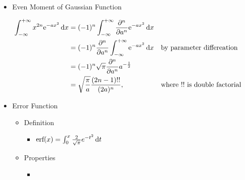 \begin{itemize}
\item Even Moment of Gaussian Function
	\begin{itemize}
	\Item \begin{align*} \displaystyle \int_{-\infty}^{+\infty} x^{2n}{\rm e}^{-ax^2}\mathop{}\!\mathrm{d} x &= (-1)^n\int^{+\infty}_{-\infty} \frac {\partial^n} {\partial a^n} {\rm e}^{-ax^2}\mathop{}\!\mathrm{d} x \\ &= (-1)^n \frac {\partial^n} {\partial a^n} \int_{-\infty}^{+\infty} {\rm e}^{-ax^2}\mathop{}\!\mathrm{d} x && \text{by parameter differeation} \\ &= (-1)^n\sqrt{\pi} \frac {\partial^n} {\partial a^n} a^{-\frac 12} \\ &= \sqrt {\frac {\pi}{a}} \frac {(2n-1)!!}{(2a)^n}, &&\text{where } !! \text{ is double factorial} \end{align*}
	\end{itemize}
\item Error Function
	\begin{itemize}
	\item Definition
		\begin{itemize}
		\item $\text{erf}(x) = \int_0^x \frac{2}{\sqrt{\pi}}e^{-t^2}\mathop{}\!\mathrm{d} t$
		\end{itemize}
	\item Properties
		\begin{itemize}
		\item
		\end{itemize}
	\end{itemize}
\end{itemize}

